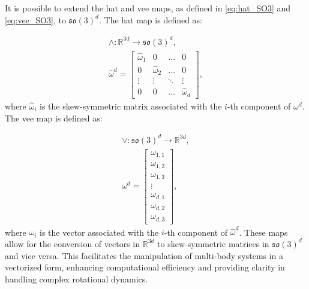 

It is possible to extend the hat and vee maps, as defined in \eqref{eq:hat_SO3} and \eqref{eq:vee_SO3}, to \( \mathfrak{so}(3)^d \). The hat map is defined as:

\begin{equation}
    \begin{aligned}
        \wedge : \mathbb{R}^{3d} \rightarrow \mathfrak{so}(3)^d, \\
        \hat{\omega}^d = 
        \begin{bmatrix}
            \hat{\omega}_1 & 0 & \dots & 0 \\
            0 & \hat{\omega}_2 & \dots & 0 \\
            \vdots & \vdots & \ddots & \vdots \\
            0 & 0 & \dots & \hat{\omega}_d
        \end{bmatrix},
    \end{aligned}
    \label{eq:hat_SO3d}
\end{equation}
where \( \hat{\omega}_i \) is the skew-symmetric matrix associated with the \(i\)-th component of \( \omega^d \). The vee map is defined as:

\begin{equation}
    \begin{aligned}
        \vee : \mathfrak{so}(3)^d \rightarrow \mathbb{R}^{3d}, \\
        \omega^d = 
        \begin{bmatrix}
            \omega_{1,1} \\ \omega_{1,2} \\ \omega_{1,3} \\
            \vdots \\
            \omega_{d,1} \\ \omega_{d,2} \\ \omega_{d,3}
        \end{bmatrix},
    \end{aligned}
    \label{eq:vee_SO3d}
\end{equation}
where \( \omega_i \) is the vector associated with the \(i\)-th component of \( \hat{\omega}^d \). These maps allow for the conversion of vectors in \( \mathbb{R}^{3d} \) to skew-symmetric matrices in \( \mathfrak{so}(3)^d \) and vice versa. This facilitates the manipulation of multi-body systems in a vectorized form, enhancing computational efficiency and providing clarity in handling complex rotational dynamics.

